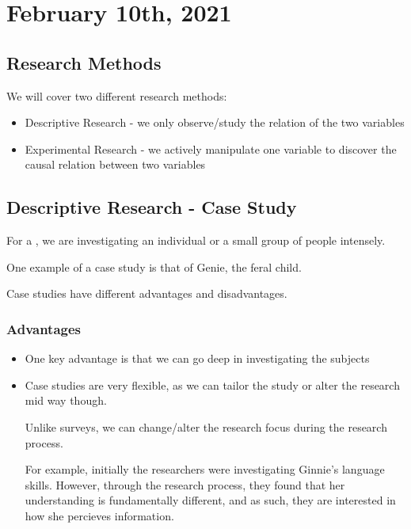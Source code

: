 \documentclass[../main/main.tex]{subfiles}
\begin{document}
\section{February 10th, 2021}
\subsection{Research Methods}
We will cover two different research methods:
\begin{itemize}
  \item Descriptive Research - we only observe/study the relation of the two variables
        \item Experimental Research - we actively manipulate one variable to discover the causal relation between two variables
\end{itemize}
\subsection{Descriptive Research - Case Study}
\begin{definition}
For a , we are investigating an individual or a small group of people intensely.

\end{definition}

\begin{example}
One example of a case study is that of Genie, the feral child.
\end{example}
Case studies have different advantages and disadvantages.
\subsubsection{Advantages}
\begin{itemize}
        \item One key advantage is that we can go deep in investigating the subjects
\item
Case studies are very flexible, as we can tailor the study or alter the research mid way though.
\begin{remark}
Unlike surveys, we can change/alter the research focus during the research process.
\end{remark}

\begin{example}
For example, initially the researchers were investigating Ginnie's language skills. However, through the research process, they found that her understanding is fundamentally different, and as such, they are interested in how she percieves information.
\end{example}
\end{itemize}
\end{document}

